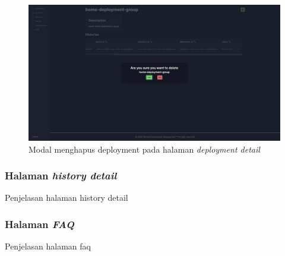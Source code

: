 \begin{figure}
  \centering
  \includegraphics[width=1\textwidth]{resources/chapter-4/dashboard/deployment-detail-delete.jpg}
  \caption{Modal menghapus deployment pada halaman \textit{deployment detail}}
  \label{fig:halaman-deployment-detail-delete}
\end{figure}

\pagebreak

\subsubsection{Halaman \textit{history detail}}
Penjelasan halaman history detail

\subsubsection{Halaman \textit{FAQ}}
Penjelasan halaman faq